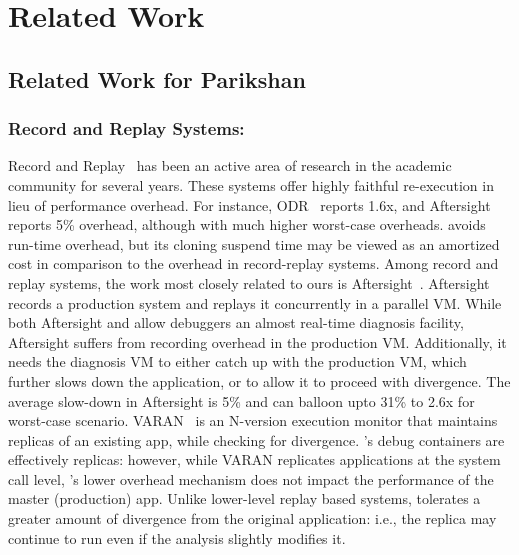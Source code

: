 \chapter{Related Work}

\section{Related Work for Parikshan}


\subsection{Record and Replay Systems:}  
Record and Replay~\cite{odr,revirt,guo2008r2,geels2007friday,doubleplay} has been an active area of research in the academic community for several years. 
These systems offer highly faithful re-execution in lieu of performance overhead. 
For instance, ODR~\cite{odr} reports 1.6x, and Aftersight~\cite{aftersight} reports 5\% overhead, although with much higher worst-case overheads.
\parikshan avoids run-time overhead, but its cloning suspend time may be viewed as an amortized cost in comparison to the overhead in record-replay systems.
Among record and replay systems, the work most closely related to ours is Aftersight~\cite{aftersight}. 
Aftersight records a production system and replays it concurrently in a parallel VM.
While both Aftersight and \parikshan allow debuggers an almost real-time diagnosis facility, Aftersight suffers from recording overhead in the production VM.
Additionally, it needs the diagnosis VM to either catch up with the production VM, which further slows down the application, or to allow it to proceed with divergence.
The average slow-down in Aftersight is 5\% and can balloon upto 31\% to 2.6x for worst-case scenario.
VARAN~\cite{Hosek:2015:VUE:2694344.2694390} is an N-version execution monitor that maintains replicas of an existing app, while checking for divergence.
\parikshan's debug containers are effectively replicas: however, while VARAN replicates applications at the system call level, \parikshan's lower overhead mechanism does not impact the performance of the master (production) app.
Unlike lower-level replay based systems, \parikshan tolerates a greater amount of divergence from the original application: i.e., the replica may continue to run even if the analysis slightly modifies it.



